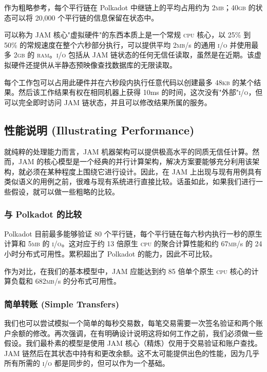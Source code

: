 作为粗略参考，每个平行链在 Polkadot 中继链上的平均占用约为 2\textsc{mb}；40\textsc{gb} 的状态可以将 20,000 个平行链的信息保留在状态中。

可以称为 JAM 核心"虚拟硬件"的东西本质上是一个常规 \textsc{cpu} 核心，以 25\% 到 50\% 的常规速度在整个六秒部分执行，可以提供平均 2\textsc{mb}/s 的通用 \textsc{i/o} 并使用最多 2\textsc{gb} 的 \textsc{ram}。\textsc{i/o} 包括从 JAM 链状态的任何无信任读取，虽然是在近期。该虚拟硬件还提供从半静态预映像查找数据库的无限读取。

每个工作包可以占用此硬件并在六秒段内执行任意代码以创建最多 48\textsc{kb} 的某个结果。然后该工作结果有权在相同机器上获得 10ms 的时间，这次没有"外部"\textsc{i/o}，但可以完全即时访问 JAM 链状态，并且可以修改结果所属的服务。

\subsection{性能说明 (Illustrating Performance)}

就纯粹的处理能力而言，JAM 机器架构可以提供极高水平的同质无信任计算。然而，JAM 的核心模型是一个经典的并行计算架构，解决方案要能够充分利用该架构，就必须在某种程度上围绕它进行设计。因此，在 JAM 上出现与现有用例具有类似语义的用例之前，很难与现有系统进行直接比较。话虽如此，如果我们进行一些假设，就可以做一些粗略的比较。

\subsubsection{与 Polkadot 的比较}
Polkadot 目前最多能够验证 80 个平行链，每个平行链在每六秒内执行一秒的原生计算和 5\textsc{mb} 的 \textsc{i/o}。这对应于约 13 倍原生 \textsc{cpu} 的聚合计算性能和约 67\textsc{mb}/s 的 24 小时分布式可用性。累积超出了 Polkadot 的能力，因此不可比较。

作为对比，在我们的基本模型中，JAM 应能达到约 85 倍单个原生 \textsc{cpu} 核心的计算负载和 682\textsc{mb}/s 的分布式可用性。

\subsubsection{简单转账 (Simple Transfers)}
我们也可以尝试模拟一个简单的每秒交易数，每笔交易需要一次签名验证和两个账户余额的修改。再次强调，在有明确设计说明这将如何工作之前，我们必须做一些假设。我们最朴素的模型是使用 JAM 核心（\ie 精炼）仅用于交易验证和账户查找。JAM 链然后在其状态中持有和更改余额。这不太可能提供出色的性能，因为几乎所有所需的 \textsc{i/o} 都是同步的，但可以作为一个基础。


